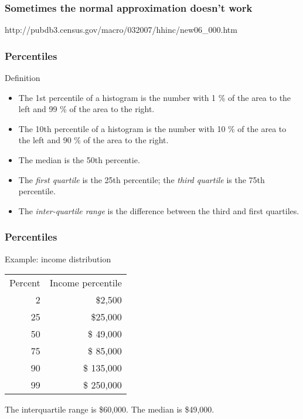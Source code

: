 \documentclass[handout]{beamer}
\begin{document}
   \begin{frame}
   \frametitle{Sometimes the normal approximation doesn't work}
   \begin{center}
   \end{center}
   http://pubdb3.census.gov/macro/032007/hhinc/new06_000.htm
   \end{frame}


   \begin{frame} \frametitle{Percentiles}

   \begin{block}
     {Definition}
     \begin{itemize}
     \item The 1st percentile of a histogram is the number with 1 \% of the
     area to the left and 99 \% of the area to the right.

     \item The 10th percentile of a histogram is the number with 10 \% of the
     area to the left and 90 \% of the area to the right.

     \item The median is the 50th percentie.

     \item The {\em first quartile} is the 25th percentile; the {\em third quartile} is the 75th percentile.

     \item The {\em inter-quartile range} is the difference between
     the third and first quartiles.
     \end{itemize}
   \end{block}
   \end{frame}


   \begin{frame} \frametitle{Percentiles}

   \begin{block}
   {Example: income distribution}

   \begin{tabular}{rr}
   Percent & Income percentile \\
   2 & \$2,500 \\
   25 & \$25,000 \\
   50 & \$ 49,000 \\
   75 & \$ 85,000 \\
   90 & \$ 135,000 \\
   99 & \$ 250,000
   \end{tabular}

   The interquartile range is \$60,000. The median is \$49,000.

   \end{block}
   \end{frame}
\end{document}
